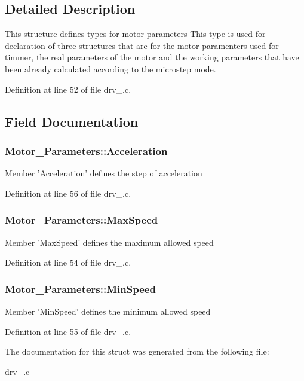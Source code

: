 \subsection{Detailed Description}
This structure defines types for motor parameters This type is used for declaration of three structures that are for the motor paramenters used for timmer, the real parameters of the motor and the working parameters that have been already calculated according to the microstep mode. 

Definition at line 52 of file drv\-\_.\-c.



\subsection{Field Documentation}
\hypertarget{structMotor__Parameters_aa9f1146edc6d945d535eec80a01481f1}{
\subsubsection[{Acceleration}]{\setlength{\rightskip}{0pt plus 5cm}Motor\-\_\-\-Parameters\-::\-Acceleration}}\label{structMotor__Parameters_aa9f1146edc6d945d535eec80a01481f1}
Member 'Acceleration' defines the step of acceleration 

Definition at line 56 of file drv\-\_.\-c.

\hypertarget{structMotor__Parameters_a501458e333945f49f03c295e2f49e3b9}{
\subsubsection[{Max\-Speed}]{\setlength{\rightskip}{0pt plus 5cm}Motor\-\_\-\-Parameters\-::\-Max\-Speed}}\label{structMotor__Parameters_a501458e333945f49f03c295e2f49e3b9}
Member 'Max\-Speed' defines the maximum allowed speed 

Definition at line 54 of file drv\-\_.\-c.

\hypertarget{structMotor__Parameters_aaf0ac3ed818f5c89cc86ea1d9174dc43}{
\subsubsection[{Min\-Speed}]{\setlength{\rightskip}{0pt plus 5cm}Motor\-\_\-\-Parameters\-::\-Min\-Speed}}\label{structMotor__Parameters_aaf0ac3ed818f5c89cc86ea1d9174dc43}
Member 'Min\-Speed' defines the minimum allowed speed 

Definition at line 55 of file drv\-\_.\-c.



The documentation for this struct was generated from the following file\-:\begin{DoxyCompactItemize}
\item 
\hyperlink{drv__8825_8c}{drv\-\_.\-c}\end{DoxyCompactItemize}
